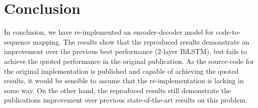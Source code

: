 \documentclass{article} %
\begin{document}
\section{Conclusion}
In conclusion, we have re-implemented an encoder-decoder model for code-to-sequence mapping. The results show that the reproduced results demonstrate an improvement over the previous best performance (2-layer BiLSTM), but fails to achieve the quoted performance in the original publication. As the source-code for the original implementation is published and capable of achieving the quoted results, it would be sensible to assume that the re-implementation is lacking in some way. On the other hand, the reproduced results still demonstrate the publications improvement over previous state-of-the-art results on this problem.



\end{document}
